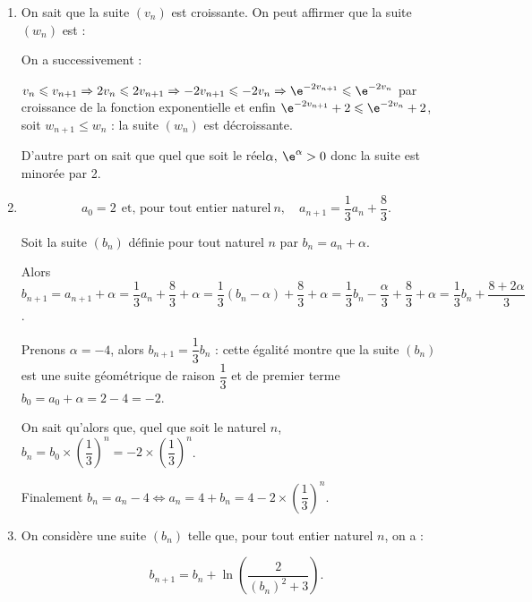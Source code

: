 \begin{enumerate}[resume]
\item On sait que la suite $\left(v_n\right)$ est croissante. On peut affirmer que la suite $\left(w_n\right)$ est :







On a successivement :

$v_n \leqslant v_{n+1} \Rightarrow 2v_n \leqslant 2v_{n+1} \Rightarrow - 2v_{n+1} \leqslant - 2v_n\Rightarrow \e^{- 2v_{n+1}} \leqslant \e^{- 2v_n}$ par croissance de la fonction exponentielle et enfin $\e^{- 2v_{n+1}} + 2 \leqslant \e^{- 2v_n} + 2$, soit $w_{n+1} \leqslant w_n$ : la suite $\left(w_n\right)$ est décroissante.

D'autre part on sait que quel que soit le réel$\alpha, \: \e^{\alpha} > 0$ donc  la suite est minorée par 2.
\item 

\[a_0 = 2 \:\:\text{et, pour tout entier naturel}\: n, \quad a_{n+1} = \dfrac13a_n + \dfrac83.\]








Soit la suite $\left(b_n\right)$ définie pour tout naturel $n$ par $b_n = a_n + \alpha$.

Alors $b_{n+1} = a_{n+1} + \alpha = \dfrac13a_n + \dfrac83 + \alpha = \dfrac13\left(b_n - \alpha \right) + \dfrac83 + \alpha = \dfrac13b_n - \dfrac{\alpha}{3} + \dfrac83 + \alpha = \dfrac13b_n + \dfrac{8 + 2\alpha}{3}$.

Prenons $\alpha = - 4$, alors $b_{n+1} = \dfrac13b_n$ : cette égalité montre que la suite $\left(b_n\right)$ est une suite géométrique de raison $\dfrac13$ et de premier terme $b_0 = a_0 + \alpha = 2 - 4 = - 2$.

On sait qu'alors que, quel que soit le naturel $n$, \: $b_n = b_0 \times \left(\dfrac{1}{3}\right)^n = - 2 \times \left(\dfrac{1}{3}\right)^n$.

Finalement $b_n = a_n - 4 \iff a_n = 4 + b_n = 4 - 2\times \left(\dfrac{1}{3}\right)^n$.
\item On considère une suite $\left(b_n\right)$ telle que, pour tout entier naturel $n$, on a :

\[b_{n+1} = b_n + \ln \left(\dfrac{2}{\left(b_n \right)^2 + 3}\right).\]










\end{enumerate}
